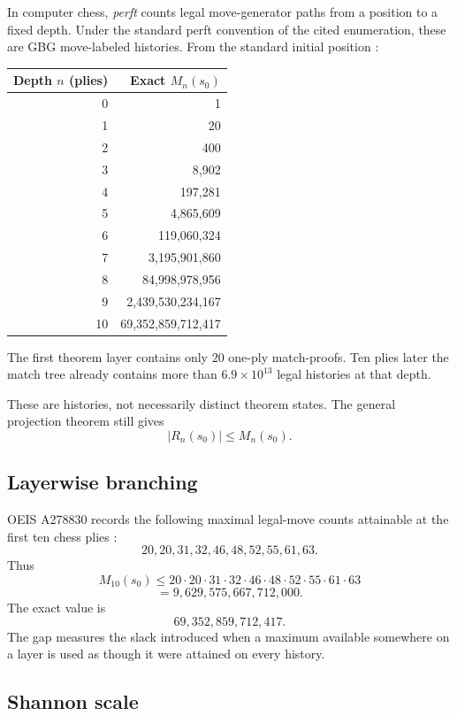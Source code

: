 \documentclass[11pt]{article}
\theoremstyle{definition}
\theoremstyle{remark}
\begin{document}
In computer chess, \emph{perft} counts legal move-generator paths from a position to a fixed depth. Under the standard perft convention of the cited enumeration, these are GBG move-labeled histories. From the standard initial position \cite{CPWPerft}:

\begin{center}
\renewcommand{\arraystretch}{1.12}
\begin{tabular}{r r}
\toprule
Depth $n$ (plies) & Exact $M_n(s_0)$ \\
\midrule
0 & 1 \\
1 & 20 \\
2 & 400 \\
3 & 8,902 \\
4 & 197,281 \\
5 & 4,865,609 \\
6 & 119,060,324 \\
7 & 3,195,901,860 \\
8 & 84,998,978,956 \\
9 & 2,439,530,234,167 \\
10 & 69,352,859,712,417 \\
\bottomrule
\end{tabular}
\end{center}

The first theorem layer contains only $20$ one-ply match-proofs. Ten plies later the match tree already contains more than $6.9\times10^{13}$ legal histories at that depth.

These are histories, not necessarily distinct theorem states. The general projection theorem still gives
\[
|R_n(s_0)|\le M_n(s_0).
\]

\subsection{Layerwise branching}

OEIS A278830 records the following maximal legal-move counts attainable at the first ten chess plies \cite{OEIS278830}:
\[
20,20,31,32,46,48,52,55,61,63.
\]
Thus
\[
M_{10}(s_0)
\le
20\cdot20\cdot31\cdot32\cdot46\cdot48\cdot52\cdot55\cdot61\cdot63
\]
\[
=9,629,575,667,712,000.
\]
The exact value is
\[
69,352,859,712,417.
\]
The gap measures the slack introduced when a maximum available somewhere on a layer is used as though it were attained on every history.

\subsection{Shannon scale}
\end{document}
